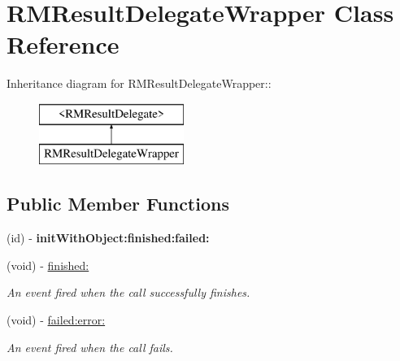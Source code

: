 \hypertarget{interface_r_m_result_delegate_wrapper}{
\section{RMResultDelegateWrapper Class Reference}
\label{interface_r_m_result_delegate_wrapper}
}
Inheritance diagram for RMResultDelegateWrapper::\begin{figure}[H]
\begin{center}
\leavevmode
\includegraphics[height=2cm]{interface_r_m_result_delegate_wrapper}
\end{center}
\end{figure}
\subsection*{Public Member Functions}
\begin{DoxyCompactItemize}
\item 
\hypertarget{interface_r_m_result_delegate_wrapper_ab2fbcbd604edd4ca182125604fecc51e}{
(id) -\/ {\bfseries initWithObject:finished:failed:}}
\label{interface_r_m_result_delegate_wrapper_ab2fbcbd604edd4ca182125604fecc51e}

\item 
(void) -\/ \hyperlink{interface_r_m_result_delegate_wrapper_ac631e09ab641294f124b0e7d81b455c3}{finished:}
\begin{DoxyCompactList}\small\item\em An event fired when the call successfully finishes. \item\end{DoxyCompactList}\item 
(void) -\/ \hyperlink{interface_r_m_result_delegate_wrapper_ad4fccdd6b67ba89b4abe76f64708b82c}{failed:error:}
\begin{DoxyCompactList}\small\item\em An event fired when the call fails. \item\end{DoxyCompactList}\end{DoxyCompactItemize}
